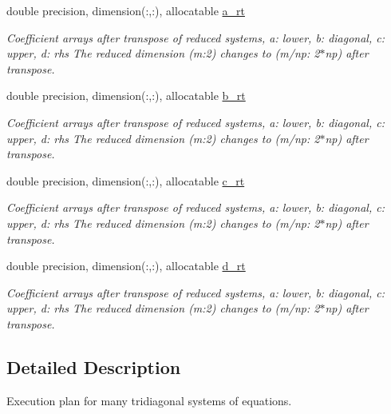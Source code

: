 \textbf{ }\par
\begin{DoxyCompactItemize}
\item 
double precision, dimension(\+:,\+:), allocatable \mbox{\hyperlink{structmodule__stdma_1_1stdma__plan__many_ab67f78f6ca2a5c48d5a9d7b3128e37e9}{a\+\_\+rt}}
\begin{DoxyCompactList}\small\item\em Coefficient arrays after transpose of reduced systems, a\+: lower, b\+: diagonal, c\+: upper, d\+: rhs The reduced dimension (m\+:2) changes to (m/np\+: 2$\ast$np) after transpose. \end{DoxyCompactList}\item 
double precision, dimension(\+:,\+:), allocatable \mbox{\hyperlink{structmodule__stdma_1_1stdma__plan__many_ac3de0f8c6e9ef01ed0fc824cfdfd93c8}{b\+\_\+rt}}
\begin{DoxyCompactList}\small\item\em Coefficient arrays after transpose of reduced systems, a\+: lower, b\+: diagonal, c\+: upper, d\+: rhs The reduced dimension (m\+:2) changes to (m/np\+: 2$\ast$np) after transpose. \end{DoxyCompactList}\item 
double precision, dimension(\+:,\+:), allocatable \mbox{\hyperlink{structmodule__stdma_1_1stdma__plan__many_ac47b44d0b8f2675b7dceff9570f2953b}{c\+\_\+rt}}
\begin{DoxyCompactList}\small\item\em Coefficient arrays after transpose of reduced systems, a\+: lower, b\+: diagonal, c\+: upper, d\+: rhs The reduced dimension (m\+:2) changes to (m/np\+: 2$\ast$np) after transpose. \end{DoxyCompactList}\item 
double precision, dimension(\+:,\+:), allocatable \mbox{\hyperlink{structmodule__stdma_1_1stdma__plan__many_a93782a813206966e7f5966baaea40710}{d\+\_\+rt}}
\begin{DoxyCompactList}\small\item\em Coefficient arrays after transpose of reduced systems, a\+: lower, b\+: diagonal, c\+: upper, d\+: rhs The reduced dimension (m\+:2) changes to (m/np\+: 2$\ast$np) after transpose. \end{DoxyCompactList}\end{DoxyCompactItemize}



\subsection{Detailed Description}
Execution plan for many tridiagonal systems of equations. 

